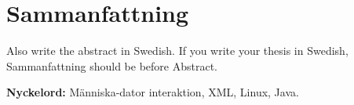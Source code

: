 \section*{Sammanfattning}\label{sec:sammanfattning}
Also write the abstract in Swedish. If you write your thesis in Swedish, Sammanfattning should be before Abstract. %

\textbf{Nyckelord:} Människa-dator interaktion, XML, Linux, Java. 

